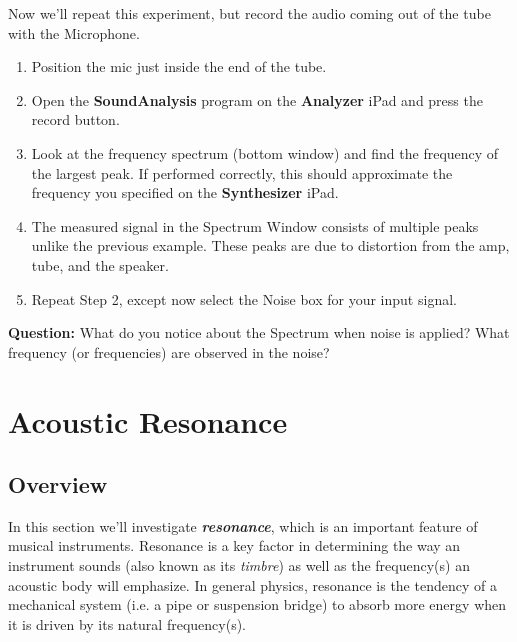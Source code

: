 \documentclass[12pt]{article}
\begin{document}
Now we'll repeat this experiment, but record the audio coming out of the tube with the Microphone.
\begin{enumerate}
\item Position the mic just inside the end of the tube.
\item Open the \textbf{SoundAnalysis} program on the \textbf{Analyzer} iPad and press the record button. 
\item Look at the frequency spectrum (bottom window) and find the frequency of the largest peak. If performed correctly, this should approximate the frequency you specified on the \textbf{Synthesizer} iPad.
\item The measured signal in the Spectrum Window consists of multiple peaks unlike the previous example. These peaks are due to distortion from the amp, tube, and the speaker.
\item Repeat Step 2, except now select the Noise box for your input signal.
\end{enumerate}

\vspace{20pt}
\textbf{Question:} What do you notice about the Spectrum when noise is applied? What frequency (or frequencies) are observed in the noise?
\vspace{50pt}

\newpage

\section {Acoustic Resonance}
\subsection {Overview}
In this section we'll investigate \textbf{\emph{resonance}}, which is an important feature of musical instruments. Resonance is a key factor in determining the way an instrument sounds (also known as its \emph{timbre}) as well as the frequency(s) an acoustic body will emphasize. In general physics, resonance is the tendency of a mechanical system (i.e. a pipe or suspension bridge) to absorb more energy when it is driven by its natural frequency(s).
\end{document}
